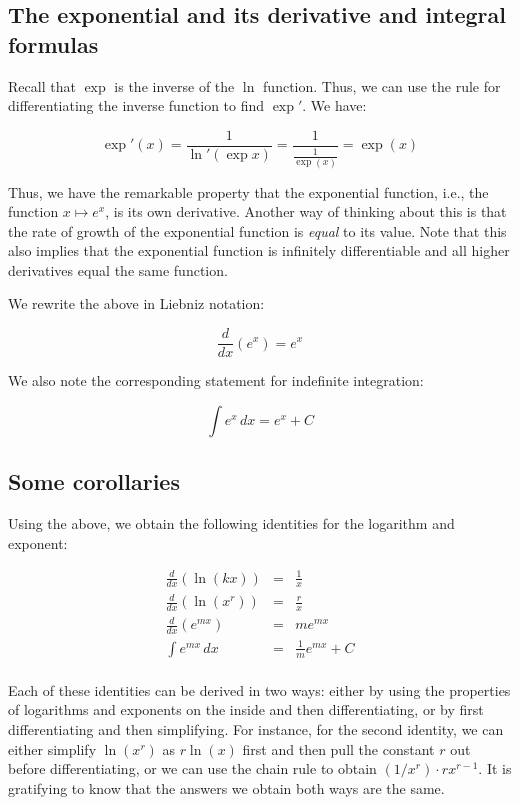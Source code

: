 \documentclass[10pt]{amsart}
\begin{document}
\subsection{The exponential and its derivative and integral formulas}

Recall that $\exp$ is the inverse of the $\ln$ function. Thus, we can
use the rule for differentiating the inverse function to find $\exp'$. We have:

$$\exp'(x) = \frac{1}{\ln'(\exp x)} = \frac{1}{\frac{1}{\exp(x)}} = \exp(x)$$

Thus, we have the remarkable property that the exponential function,
i.e., the function $x \mapsto e^x$, is its own derivative. Another way
of thinking about this is that the rate of growth of the exponential
function is {\em equal} to its value. Note that this also implies that
the exponential function is infinitely differentiable and all higher
derivatives equal the same function.

We rewrite the above in Liebniz notation:

$$\frac{d}{dx}(e^x) = e^x$$

We also note the corresponding statement for indefinite integration:

$$\int e^x \, dx = e^x + C$$

\subsection{Some corollaries}

Using the above, we obtain the following identities for the logarithm
and exponent:

\begin{eqnarray*}
  \frac{d}{dx} (\ln (kx)) & = & \frac{1}{x}\\
  \frac{d}{dx} (\ln (x^r)) & = & \frac{r}{x}\\
  \frac{d}{dx} (e^{mx}) & = & me^{mx}\\
  \int e^{mx} \, dx & = & \frac{1}{m}e^{mx} + C\\
\end{eqnarray*}

Each of these identities can be derived in two ways: either by using
the properties of logarithms and exponents on the inside and then
differentiating, or by first differentiating and then simplifying. For
instance, for the second identity, we can either simplify $\ln(x^r)$
as $r \ln(x)$ first and then pull the constant $r$ out before
differentiating, or we can use the chain rule to obtain $(1/x^r) \cdot
rx^{r-1}$. It is gratifying to know that the answers we obtain both
ways are the same.
\end{document}
